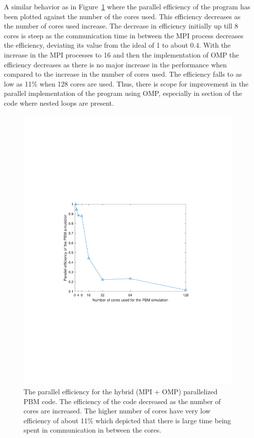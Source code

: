 \documentclass[preprint,11pt,authoryear]{elsarticle}
\begin{document}
A similar behavior as in Figure~\ref{fig:rslts_PBM_parallel_efficiency} where the parallel 
efficiency of the program has been plotted against the number of the cores used. This efficiency 
decreases as the number of cores used increase. The decrease in efficiency initially up till 8 cores is steep as 
the communication time in between the MPI process decreases the efficiency, deviating its value from 
the ideal of 1 to about 0.4. With the increase in the MPI processes to 16 and then the 
implementation of OMP the efficiency decreases as there is no major increase in the performance 
when compared to the increase in the number of cores used. The efficiency falls to as low as 11\% 
when 128 cores are used. Thus, there is scope for improvement in the parallel implementation 
of the program using OMP, especially in section of the code where nested loops are present.

\begin{figure}
\centering
\includegraphics[scale=0.75]{rslsts_PBM_efficiency.pdf}
\caption{The parallel efficiency for the hybrid (MPI + OMP) parallelized PBM code. The efficiency of the 
code decreased as the number of cores are increased. The higher number of cores have very low 
efficiency of about 11\% which depicted that there is large time being spent in communication in 
between the cores.}
\label{fig:rslts_PBM_parallel_efficiency}
\end{figure}
\end{document}
